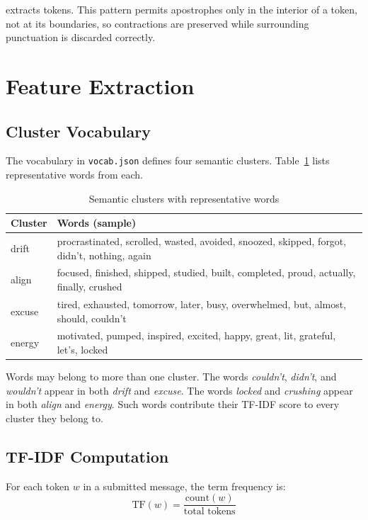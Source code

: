 \documentclass[11pt, a4paper]{report}
\begin{document}
extracts tokens. This pattern permits apostrophes only in the interior of a
token, not at its boundaries, so contractions are preserved while
surrounding punctuation is discarded correctly.

\section{Feature Extraction}

\subsection{Cluster Vocabulary}

The vocabulary in \texttt{vocab.json} defines four semantic clusters.
Table~\ref{tab:clusters} lists representative words from each.

\begin{table}[H]
\centering
\caption{Semantic clusters with representative words}
\label{tab:clusters}
\begin{tabularx}{\textwidth}{@{} p{1.8cm} X @{}}
\toprule
\textbf{Cluster} & \textbf{Words (sample)} \\
\midrule
drift
  & procrastinated, scrolled, wasted, avoided, snoozed, skipped,
    forgot, didn't, nothing, again \\[4pt]
align
  & focused, finished, shipped, studied, built, completed, proud,
    actually, finally, crushed \\[4pt]
excuse
  & tired, exhausted, tomorrow, later, busy, overwhelmed, but,
    almost, should, couldn't \\[4pt]
energy
  & motivated, pumped, inspired, excited, happy, great, lit,
    grateful, let's, locked \\
\bottomrule
\end{tabularx}
\end{table}

Words may belong to more than one cluster. The words \textit{couldn't},
\textit{didn't}, and \textit{wouldn't} appear in both \textit{drift} and
\textit{excuse}. The words \textit{locked} and \textit{crushing} appear in
both \textit{align} and \textit{energy}. Such words contribute their
TF-IDF score to every cluster they belong to.

\subsection{TF-IDF Computation}

For each token $w$ in a submitted message, the term frequency is:
\begin{equation}
  \mathrm{TF}(w) = \frac{\mathrm{count}(w)}{\text{total tokens}}
\end{equation}
\end{document}
